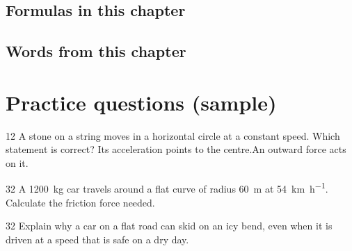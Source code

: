 \subsection{Formulas in this chapter}
\begin{formulatable}
\end{formulatable}

\subsection{Words from this chapter}
\begin{glossarytable}
\end{glossarytable}

\section*{Practice questions (sample)}

\begin{practiceq}{1}{2}
A stone on a string moves in a horizontal circle at a constant speed. Which
statement is correct?
        {Its acceleration points to the centre.}{An outward force acts on it.}
\end{practiceq}

\begin{practiceq}{3}{2}
A \qty{1200}{kg} car travels around a flat curve of radius \qty{60}{m} at
\qty{54}{km.h^{-1}}. Calculate the friction force needed.
\end{practiceq}

\begin{practiceq}{3}{2}
Explain why a car on a flat road can skid on an icy bend, even when it is
driven at a speed that is safe on a dry day.
\end{practiceq}
